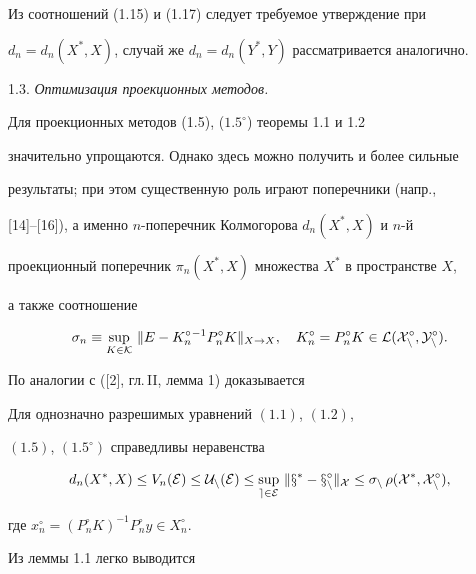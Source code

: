 Из соотношений (1.15) и (1.17) следует требуемое утверждение при


$d_n=d_n(X^*,X)$, случай же $d_n=d_n(Y^*,Y)$ рассматривается аналогично.


\medskip





1.3. {\it Оптимизация проекционных методов.}


Для проекционных методов (1.5), ($1.5^\circ $) теоремы 1.1 и 1.2


значительно упрощаются. Однако здесь можно получить и более сильные


результаты; при этом существенную роль играют поперечники (напр.,


[14]--[16]), а именно $n$-поперечник Колмогорова $d_n(X^*,X)$ и $n$-й


проекционный поперечник $\pi_n(X^*,X)$ множества $X^*$ в пространстве $X$,


а также соотношение


$$


\sigma_n\equiv \sup_{K\in \cal K}\, \|E-K_n^\circ {}^{-1}P_n^\circ


K\|_{X\rightarrow X},\quad


K_n^\circ =P_n^\circ K\in \cal L(X_n^\circ ,Y_n^\circ) .


$$





По аналогии с ([2], гл.\,II, лемма 1) доказывается





\begin{lems}


Для однозначно разрешимых уравнений $(1.1)$, $(1.2)$,


$(1.5)$, $(1.5^\circ)$ справедливы неравенства


$$


d_n(X^*,X)\leq V_n(\cal E)\leq U_n(\cal E)\leq


\sup_{e\in\cal E}\, \|x^*-x_n^\circ\|_X\leq \sigma_n\, \rho(X^*,


X_n^\circ),


$$


где $x_n^\circ =(P_n^\circ K)^{-1} P_n^\circ y\in X_n^\circ $.


\end{lems}





Из леммы 1.1 легко выводится





